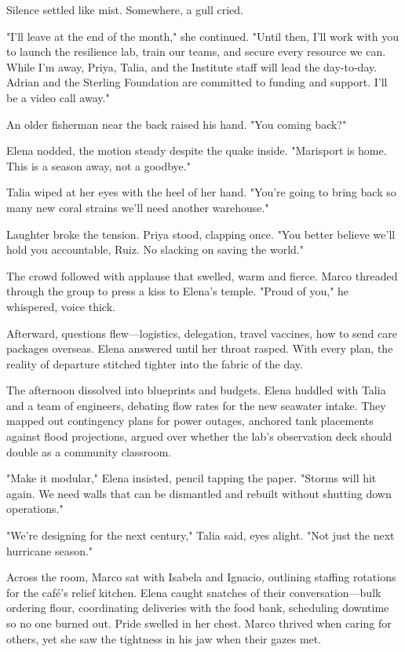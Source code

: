 Silence settled like mist. Somewhere, a gull cried.

"I'll leave at the end of the month," she continued. "Until then, I'll work with you to launch the resilience lab, train our teams, and secure every resource we can. While I'm away, Priya, Talia, and the Institute staff will lead the day-to-day. Adrian and the Sterling Foundation are committed to funding and support. I'll be a video call away."

An older fisherman near the back raised his hand. "You coming back?"

Elena nodded, the motion steady despite the quake inside. "Marisport is home. This is a season away, not a goodbye."

Talia wiped at her eyes with the heel of her hand. "You're going to bring back so many new coral strains we'll need another warehouse."

Laughter broke the tension. Priya stood, clapping once. "You better believe we'll hold you accountable, Ruiz. No slacking on saving the world."

The crowd followed with applause that swelled, warm and fierce. Marco threaded through the group to press a kiss to Elena's temple. "Proud of you," he whispered, voice thick.

Afterward, questions flew—logistics, delegation, travel vaccines, how to send care packages overseas. Elena answered until her throat rasped. With every plan, the reality of departure stitched tighter into the fabric of the day.

\bigskip

The afternoon dissolved into blueprints and budgets. Elena huddled with Talia and a team of engineers, debating flow rates for the new seawater intake. They mapped out contingency plans for power outages, anchored tank placements against flood projections, argued over whether the lab's observation deck should double as a community classroom.

"Make it modular," Elena insisted, pencil tapping the paper. "Storms will hit again. We need walls that can be dismantled and rebuilt without shutting down operations."

"We're designing for the next century," Talia said, eyes alight. "Not just the next hurricane season."

Across the room, Marco sat with Isabela and Ignacio, outlining staffing rotations for the café's relief kitchen. Elena caught snatches of their conversation—bulk ordering flour, coordinating deliveries with the food bank, scheduling downtime so no one burned out. Pride swelled in her chest. Marco thrived when caring for others, yet she saw the tightness in his jaw when their gazes met.

